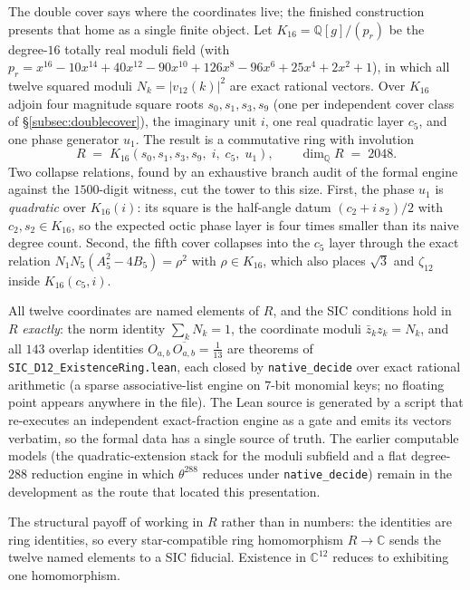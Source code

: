 \documentclass[12pt,a4paper]{article}
\begin{document}
The double cover says where the coordinates live; the finished construction
presents that home as a single finite object.  Let
$K_{16} = \mathbb{Q}[g]/(p_r)$ be the degree-$16$ totally real moduli field
(with
$p_r = x^{16}-10x^{14}+40x^{12}-90x^{10}+126x^{8}-96x^{6}+25x^{4}+2x^{2}+1$),
in which all twelve squared moduli $N_k = |v_{12}(k)|^2$ are exact rational
vectors.  Over $K_{16}$ adjoin four magnitude square roots $s_0, s_1, s_3,
s_9$ (one per independent cover class of \S\ref{subsec:doublecover}), the
imaginary unit $i$, one real quadratic layer $c_5$, and one phase generator
$u_1$.  The result is a commutative ring with involution
\[
R \;=\; K_{16}(s_0, s_1, s_3, s_9,\; i,\; c_5,\; u_1),
\qquad \dim_{\mathbb{Q}} R \;=\; 2048 .
\]
Two collapse relations, found by an exhaustive branch audit of the formal
engine against the $1500$-digit witness, cut the tower to this size.  First,
the phase $u_1$ is \emph{quadratic} over $K_{16}(i)$: its square is the
half-angle datum $(c_2 + i\,s_2)/2$ with $c_2, s_2 \in K_{16}$, so the
expected octic phase layer is four times smaller than its naive degree
count.  Second, the fifth cover collapses into the $c_5$ layer through the
exact relation $N_1 N_5 (A_5^2 - 4B_5) = \rho^2$ with $\rho \in K_{16}$,
which also places $\sqrt{3}$ and $\zeta_{12}$ inside $K_{16}(c_5, i)$.

All twelve coordinates are named elements of $R$, and the SIC conditions
hold in $R$ \emph{exactly}: the norm identity $\sum_k N_k = 1$, the
coordinate moduli $\bar z_k z_k = N_k$, and all $143$ overlap identities
$O_{a,b}\,\overline{O_{a,b}} = \tfrac{1}{13}$ are theorems of
\texttt{SIC\_D12\_ExistenceRing.lean}, each closed by
\texttt{native\_decide} over exact rational arithmetic (a sparse
associative-list engine on $7$-bit monomial keys; no floating point appears
anywhere in the file).  The Lean source is generated by a script that
re-executes an independent exact-fraction engine as a gate and emits its
vectors verbatim, so the formal data has a single source of truth.  The
earlier computable models (the quadratic-extension stack for the moduli
subfield and a flat degree-$288$ reduction engine in which $\theta^{288}$
reduces under \texttt{native\_decide}) remain in the development as the
route that located this presentation.

The structural payoff of working in $R$ rather than in numbers: the
identities are ring identities, so every star-compatible ring homomorphism
$R \to \mathbb{C}$ sends the twelve named elements to a SIC fiducial.
Existence in $\mathbb{C}^{12}$ reduces to exhibiting one homomorphism.
\end{document}
